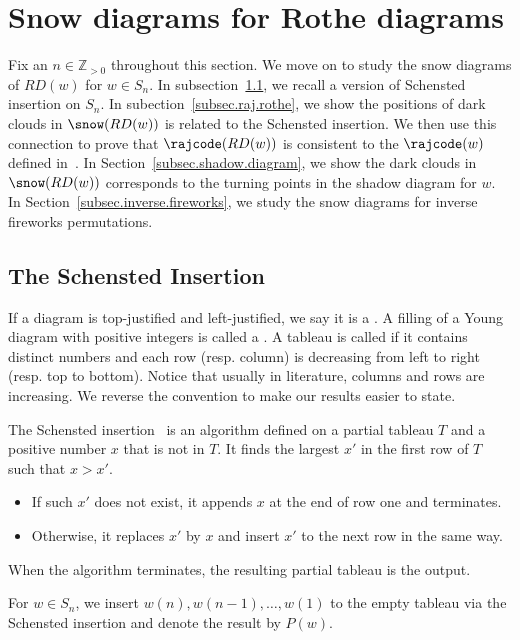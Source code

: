 \section{Snow diagrams for Rothe diagrams}
\label{S: permutations}
Fix an $n \in \mathbb{Z}_{>0}$
throughout this section. 
We move on to study the snow diagrams 
of $RD(w)$ for $w \in S_n$. 
In subsection~\ref{SS: insertion},
we recall a version of Schensted insertion on $S_n$.
In subection~\ref{subsec.raj.rothe}, we 
show the positions of dark clouds in $\snow(RD(w))$ 
is related to the Schensted insertion.
We then use this connection to 
prove that $\rajcode(RD(w))$ is consistent 
to the $\rajcode(w)$ defined in~\cite{PSW}.
In Section~\ref{subsec.shadow.diagram}, we show the dark clouds
in $\snow(RD(w))$ corresponds to
the turning points in the shadow diagram for $w$.
In Section~\ref{subsec.inverse.fireworks}, we study the
snow diagrams for inverse fireworks permutations.

\subsection{The Schensted Insertion}
\label{SS: insertion}

If a diagram is top-justified and left-justified,
we say it is a .
A filling of a Young diagram with positive integers
is called a .
A tableau is called 
if it contains distinct numbers and 
each row (resp. column) is decreasing from left to right 
(resp. top to bottom).
Notice that usually in literature, columns and rows 
are increasing. 
We reverse the convention to make our results easier to state.

The Schensted insertion~\cite{Sch}
is an algorithm defined on a partial tableau $T$ and 
a positive number $x$ that is not in $T$.
It finds the largest $x'$
in the first row of $T$ 
such that $x > x'$.
\begin{itemize}
    \item If such $x'$ does not exist,
it appends $x$ at the end of row one
and terminates.
    \item Otherwise, it replaces $x'$ by $x$
and insert $x'$ to the next row
in the same way. 
\end{itemize}
When the algorithm terminates, 
the resulting partial tableau is the output. 

For $w \in S_n$, we insert $w(n), w(n-1), \dots, w(1)$ to the empty tableau via the Schensted insertion and denote the result by $P(w)$. 


